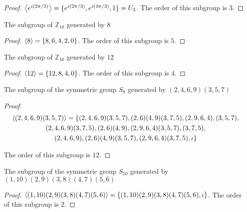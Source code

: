 \begin{proof}
    $\left\langle{e^{i(2\pi/3)}}\right\rangle = \{ e^{i(2\pi/3)}, e^{i(4\pi/3)}, 1 \} = U_{3}$. The order of this subgroup is $3$.
\end{proof}

\newpage
\begin{exercise}
    The subgroup of $\mathbb{Z}_{10}$ generated by $8$
\end{exercise}

\begin{proof}
    $\left\langle{8}\right\rangle = \{ 8, 6, 4, 2, 0 \}$. The order of this subgroup is $5$.
\end{proof}

\newpage
\begin{exercise}
    The subgroup of $\mathbb{Z}_{16}$ generated by $12$
\end{exercise}

\begin{proof}
    $\left\langle{12}\right\rangle = \{ 12, 8, 4, 0 \}$. The order of this subgroup is $4$.
\end{proof}

\newpage
\begin{exercise}
    The subgroup of the symmetric group $S_{8}$ generated by $(2, 4, 6, 9)(3, 5, 7)$
\end{exercise}

\begin{proof}
    \begin{multline*}
        \left\langle{(2, 4, 6, 9)(3, 5, 7)}\right\rangle = \{ (2, 4, 6, 9)(3, 5, 7), (2, 6)(4, 9)(3, 7, 5), (2, 9, 6, 4), (3, 5, 7), \\
        (2, 4, 6, 9)(3, 7, 5), (2, 6)(4, 9), (2, 9, 6, 4)(3, 5, 7), (3, 7, 5), \\
        (2, 4, 6, 9), (2, 6)(4, 9)(3, 5, 7), (2, 9, 6, 4)(3, 7, 5), \iota \}
    \end{multline*}

    The order of this subgroup is $12$.
\end{proof}

\newpage
\begin{exercise}
    The subgroup of the symmetric group $S_{10}$ generated by $(1, 10)(2, 9)(3, 8)(4, 7)(5, 6)$
\end{exercise}

\begin{proof}
    $\left\langle{(1, 10)(2, 9)(3, 8)(4, 7)(5, 6)}\right\rangle = \{ (1, 10)(2, 9)(3, 8)(4, 7)(5, 6), \iota \}$. The order of this subgroup is $2$.
\end{proof}


